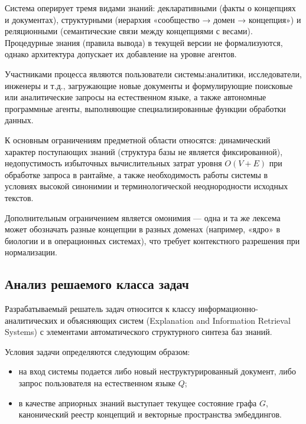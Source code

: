 Система оперирует тремя видами знаний: декларативными (факты о концепциях и документах), структурными (иерархия «сообщество → домен → концепция») и реляционными (семантические связи между концепциями с весами). Процедурные знания (правила вывода) в текущей версии не формализуются, однако архитектура допускает их добавление на уровне агентов.

Участниками процесса являются пользователи системы:аналитики, исследователи, инженеры и т.д., загружающие новые документы и формулирующие поисковые или аналитические запросы на естественном языке, а также автономные программные агенты, выполняющие специализированные функции обработки данных.


К основным ограничениям предметной области относятся: динамический характер поступающих знаний (структура базы не является фиксированной), недопустимость избыточных вычислительных затрат уровня $O(V+E)$ при обработке запроса в рантайме, а также необходимость работы системы в условиях высокой синонимии и терминологической неоднородности исходных текстов.

Дополнительным ограничением является омонимия — одна и та же лексема может обозначать разные концепции в разных доменах (например, «ядро» в биологии и в операционных системах), что требует контекстного разрешения при нормализации.

\subsection{Анализ решаемого класса задач}

Разрабатываемый решатель задач относится к классу информационно-аналитических и объясняющих систем (Explanation and Information Retrieval Systems) с элементами автоматического структурного синтеза баз знаний.

Условия задачи определяются следующим образом:
\begin{itemize}
    \item на вход системы подается либо новый неструктурированный документ, либо запрос пользователя на естественном языке $Q$;
    \item в качестве априорных знаний выступает текущее состояние графа $G$, канонический реестр концепций и векторные пространства эмбеддингов.
\end{itemize}

